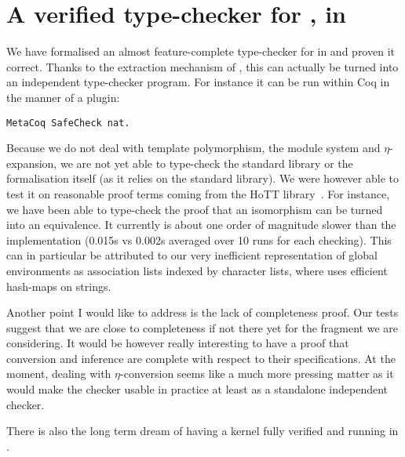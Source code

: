 \section*{A verified type-checker for \Coq, in \Coq}

We have formalised an almost feature-complete type-checker for \Coq in \Coq
and proven it correct. Thanks to the extraction mechanism of \Coq, this can
actually be turned into an independent type-checker program.
For instance it can be run within Coq in the manner of a plugin:
\begin{verbatim}
MetaCoq SafeCheck nat.
\end{verbatim}

Because we do not deal with template polymorphism, the module system and
\(\eta\)-expansion, we are not yet able to type-check the standard library
or the formalisation itself (as it relies on the standard library).
We were however able to test it on reasonable proof terms coming from
the \acrshort{HoTT} library~.
%
For instance, we have been able to type-check the proof that an isomorphism can
be turned into an equivalence.
It currently is about one order of magnitude slower than the \Coq
implementation (0.015s vs 0.002s averaged over 10 runs for each checking).
This can in particular be attributed to our very inefficient representation of
global environments as association lists indexed by character lists, where \Coq
uses efficient hash-maps on strings.

Another point I would like to address is the lack of completeness proof.
Our tests suggest that we are close to completeness if not there yet for the
fragment we are considering. It would be however really interesting to have a
proof that conversion and inference are complete with respect to their
specifications.
At the moment, dealing with \(\eta\)-conversion seems like a much more pressing
matter as it would make the checker usable in practice at least as a standalone
independent checker.

There is also the long term dream of having a \Coq kernel fully verified and
running in \Coq.